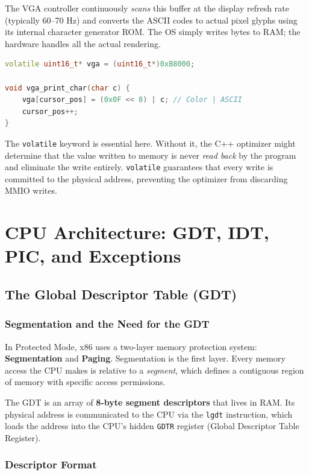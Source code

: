 \documentclass[12pt,a4paper]{report}
\begin{document}
The VGA controller continuously \textit{scans} this buffer at the display refresh rate
(typically 60--70 Hz) and converts the ASCII codes to actual pixel glyphs using its
internal character generator ROM. The OS simply writes bytes to RAM; the hardware
handles all the actual rendering.

\begin{lstlisting}[language=C++, title=kernel/vga.cpp -- Core MMIO interaction]
volatile uint16_t* vga = (uint16_t*)0xB8000;

void vga_print_char(char c) {
    vga[cursor_pos] = (0x0F << 8) | c; // Color | ASCII
    cursor_pos++;
}
\end{lstlisting}

The \texttt{volatile} keyword is essential here. Without it, the C++ optimizer might
determine that the value written to memory is never \textit{read back} by the program
and eliminate the write entirely. \texttt{volatile} guarantees that every write is
committed to the physical address, preventing the optimizer from discarding MMIO writes.

\newpage

\chapter{CPU Architecture: GDT, IDT, PIC, and Exceptions}

\section{The Global Descriptor Table (GDT)}

\subsection{Segmentation and the Need for the GDT}

In Protected Mode, x86 uses a two-layer memory protection system: \textbf{Segmentation}
and \textbf{Paging}. Segmentation is the first layer. Every memory access the CPU makes
is relative to a \textit{segment}, which defines a contiguous region of memory with
specific access permissions.

The GDT is an array of \textbf{8-byte segment descriptors} that lives in RAM. Its
physical address is communicated to the CPU via the \texttt{lgdt} instruction, which
loads the address into the CPU's hidden \texttt{GDTR} register (Global Descriptor Table
Register).

\subsection{Descriptor Format}
\end{document}
